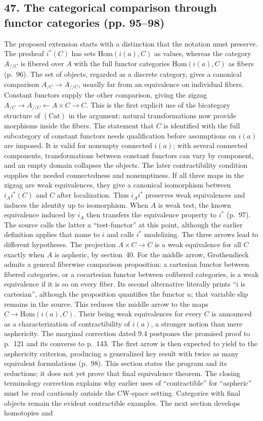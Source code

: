 \documentclass[10pt,oneside]{book}
\begin{document}
\subsection*{47. The categorical comparison through functor categories (pp. 95--98)}
The proposed extension starts with a distinction that the notation must preserve. The presheaf $i^*(C)$ has sets $\mathrm{Hom}(i(a),C)$ as values, whereas the category $A_{//C}$ is fibered over $A$ with the full functor categories $\underline{\mathrm{Hom}}(i(a),C)$ as fibers (p.~96). The set of objects, regarded as a discrete category, gives a canonical comparison $A_{/C}\to A_{//C}$, usually far from an equivalence on individual fibers. Constant functors supply the other comparison, giving the zigzag $A_{/C}\to A_{//C}\leftarrow A\times C\to C$. This is the first explicit use of the bicategory structure of $(\mathrm{Cat})$ in the argument: natural transformations now provide morphisms inside the fibers. The statement that $C$ is identified with the full subcategory of constant functors needs qualification before assumptions on $i(a)$ are imposed. It is valid for nonempty connected $i(a)$; with several connected components, transformations between constant functors can vary by component, and an empty domain collapses the objects. The later contractibility condition supplies the needed connectedness and nonemptiness. If all three maps in the zigzag are weak equivalences, they give a canonical isomorphism between $i_Ai^*(C)$ and $C$ after localization. Thus $i_Ai^*$ preserves weak equivalences and induces the identity up to isomorphism. When $A$ is weak test, the known equivalence induced by $i_A$ then transfers the equivalence property to $i^*$ (p.~97). The source calls the latter a ``test-functor'' at this point, although the earlier definition applies that name to $i$ and calls $i^*$ modelizing. The three arrows lead to different hypotheses. The projection $A\times C\to C$ is a weak equivalence for all $C$ exactly when $A$ is aspheric, by section~40. For the middle arrow, Grothendieck admits a general fiberwise comparison proposition: a cartesian functor between fibered categories, or a cocartesian functor between cofibered categories, is a weak equivalence if it is so on every fiber. Its second alternative literally prints ``i is cartesian'', although the proposition quantifies the functor $u$; that variable slip remains in the source. This reduces the middle arrow to the maps $C\to\underline{\mathrm{Hom}}(i(a),C)$. Their being weak equivalences for every $C$ is announced as a characterization of contractibility of $i(a)$, a stronger notion than mere asphericity. The marginal correction dated 9.4 postpones the promised proof to p.~121 and its converse to p.~143. The first arrow is then expected to yield to the asphericity criterion, producing a generalized key result with twice as many equivalent formulations (p.~98). This section states the program and its reductions; it does not yet prove that final equivalence theorem. The closing terminology correction explains why earlier uses of ``contractible'' for ``aspheric'' must be read cautiously outside the CW-space setting. Categories with final objects remain the evident contractible examples. The next section develops homotopies and 
\end{document}
